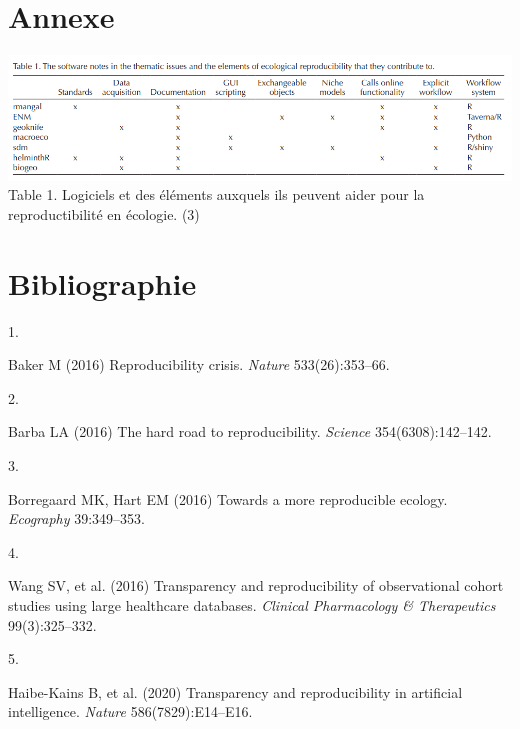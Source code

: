 \documentclass[9pt,twocolumn,twoside,]{pnas-new}
\newlength{\cslhangindent}
\newlength{\csllabelwidth}
\newlength{\cslentryspacingunit} %
\newenvironment{CSLReferences}[2] %
 {%
  \setlength{\parindent}{0pt}
  \ifodd #1
  \let\oldpar\par
  \def\par{\hangindent=\cslhangindent\oldpar}
  \fi
  \setlength{\parskip}{#2\cslentryspacingunit}
 }%
 {}
\newcommand{\CSLLeftMargin}[1]{\parbox[t]{\csllabelwidth}{#1}}
\newcommand{\CSLRightInline}[1]{\parbox[t]{\linewidth - \csllabelwidth}{#1}\break}
\begin{document}
\hypertarget{annexe}{%
\section{Annexe}\label{annexe}}

\href{@borregaard2016towards}{\includegraphics{images/Borregaard2016-01.png}}
Table 1. Logiciels et des éléments auxquels ils peuvent aider pour la
reproductibilité en écologie. (3)

\newpage
\newpage

\hypertarget{bibliographie}{%
\section*{Bibliographie}\label{bibliographie}}

\hypertarget{refs}{}
\begin{CSLReferences}{0}{0}
\leavevmode{}%
\CSLLeftMargin{1. }
\CSLRightInline{Baker M (2016) Reproducibility crisis. \emph{Nature}
533(26):353--66.}

\leavevmode{}%
\CSLLeftMargin{2. }
\CSLRightInline{Barba LA (2016) The hard road to reproducibility.
\emph{Science} 354(6308):142--142.}

\leavevmode{}%
\CSLLeftMargin{3. }
\CSLRightInline{Borregaard MK, Hart EM (2016) Towards a more
reproducible ecology. \emph{Ecography} 39:349--353.}

\leavevmode{}%
\CSLLeftMargin{4. }
\CSLRightInline{Wang SV, et al. (2016) Transparency and reproducibility
of observational cohort studies using large healthcare databases.
\emph{Clinical Pharmacology \& Therapeutics} 99(3):325--332.}

\leavevmode{}%
\CSLLeftMargin{5. }
\CSLRightInline{Haibe-Kains B, et al. (2020) Transparency and
reproducibility in artificial intelligence. \emph{Nature}
586(7829):E14--E16.}

\end{CSLReferences}



% 
\end{document}
